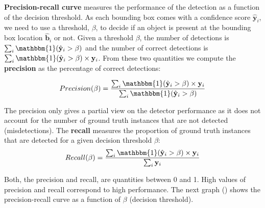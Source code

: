 {\bf Precision-recall curve} measures the performance of the detection as a function of the decision threshold. As each bounding box comes with a confidence score $\hat{\mathbf{y}}_i$, we need to use a threshold, $\beta$, to decide if an object is present at the bounding box location $\hat{\mathbf{b}}_i$ or not. Given a threshold $\beta$, the number of detections is $\sum_i  \mathbbm{1} (\hat{\mathbf{y}}_i > \beta)$ and the number of correct detections is $\sum_i  \mathbbm{1} (\hat{\mathbf{y}}_i > \beta) \times \mathbf{y}_i$. From these two quantities we compute the {\bf precision} as the percentage of correct detections:


\begin{equation}
Precision(\beta) = \frac{\sum_i  \mathbbm{1} (\hat{\mathbf{y}}_i > \beta) \times \mathbf{y}_i} {\sum_i  \mathbbm{1} (\hat{\mathbf{y}}_i > \beta)}
\end{equation}

The precision only gives a partial view on the detector performance as it does not account for the number of ground truth instances that are not detected (misdetections). The {\bf recall} measures the proportion of ground truth instances that are detected for a given decision threshold $\beta$:
\begin{equation}
Recall (\beta) = \frac{\sum_i  \mathbbm{1} (\hat{\mathbf{y}}_i > \beta) \times \mathbf{y}_i} {\sum_i \mathbf{y}_i}
\end{equation}

Both, the precision and recall, are quantities between 0 and 1. High values of precision and recall correspond to high performance. The next graph (\fig{\ref{fig:example_precision_recall}}) shows the precision-recall curve as a function of $\beta$ (decision threshold).


